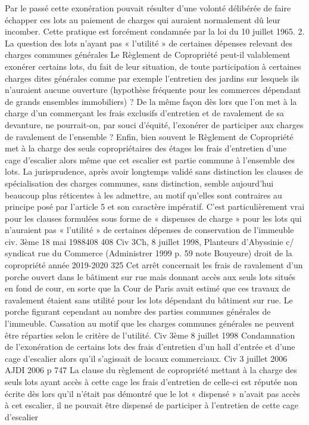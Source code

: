 		Par le passé cette exonération pouvait résulter d'une volonté délibérée de faire échapper ces lots au paiement de charges qui auraient normalement dû leur incomber. Cette pratique est forcément condamnée par la loi du 10 juillet 1965.
		2. La question des lots n’ayant pas « l’utilité » de certaines dépenses relevant des charges communes générales
		Le Règlement de Copropriété peut-il valablement exonérer certains lots, du fait de leur situation, de toute participation à certaines charges dites générales comme par exemple l'entretien des jardins sur lesquels ils n'auraient aucune ouverture (hypothèse fréquente pour les commerces dépendant de grands ensembles immobiliers) ?
		De la même façon dès lors que l'on met à la charge d'un commerçant les frais exclusifs d'entretien et de ravalement de sa devanture, ne pourrait-on, par souci d'équité, l'exonérer de participer aux charges de ravalement de l'ensemble ?
		Enfin, bien souvent le Règlement de Copropriété met à la charge des seuls copropriétaires des étages les frais d’entretien d’une cage d’escalier alors même que cet escalier est partie commune à l’ensemble des lots.
		La jurisprudence, après avoir longtemps validé sans distinction les clauses de spécialisation des charges communes, sans distinction, semble aujourd’hui beaucoup plus réticentes à les admettre, au motif qu’elles sont contraires au principe posé par l’article 5 et son caractère impératif. C’est particulièrement vrai pour les clauses formulées sous forme de « dispenses de charge » pour les lots qui n’auraient pas « l’utilité » de certaines dépenses de conservation de l’immeuble
		civ. 3ème 18 mai 1988408
		408 Civ 3\degres Ch, 8 juillet 1998, Planteurs d’Abyssinie c/ syndicat rue du Commerce (Administrer 1999  p. 59 note Bouyeure)
		droit de la copropriété année 2019-2020
		325
		Cet arrêt concernait les frais de ravalement d’un porche ouvert dans le bâtiment sur rue mais donnant accès aux seuls lots situés en fond de cour, en sorte que la Cour de Paris avait estimé que ces travaux de ravalement étaient sans utilité pour les lots dépendant du bâtiment sur rue. Le porche figurant cependant au nombre des parties communes générales de l’immeuble. Cassation au motif que les charges communes générales ne peuvent être réparties selon le critère de l’utilité.
		Civ 3ème 8 juillet 1998
		Condamnation de l’exonération de certains lots des frais d’entretien d’un hall d’entrée et d’une cage d’escalier alors qu’il s’agissait de locaux commerciaux.
		Civ 3 juillet 2006 AJDI 2006 p 747
		La clause du règlement de copropriété mettant à la charge des seuls lots ayant accès à cette cage les frais d’entretien de celle-ci est réputée non écrite dès lors qu’il n’était pas démontré que le lot « dispensé » n’avait pas accès à cet escalier, il ne pouvait être dispensé de participer à l’entretien de cette cage d’escalier
